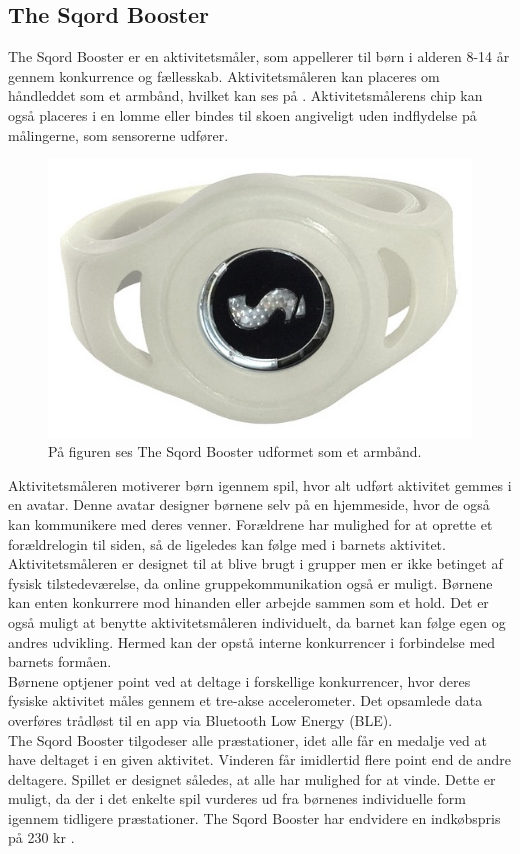 \subsection{The Sqord Booster}
The Sqord Booster er en aktivitetsmåler, som appellerer til børn i alderen 8-14 år gennem konkurrence og fællesskab. Aktivitetsmåleren kan placeres om håndleddet som et armbånd, hvilket kan ses på . Aktivitetsmålerens chip kan også placeres i en lomme eller bindes til skoen angiveligt uden indflydelse på målingerne, som sensorerne udfører. 
\begin{figure}[H]
	\centering
	\includegraphics[scale=0.21]{figures/aProblemanalyse/sqord.JPG}
	\caption{På figuren ses The Sqord Booster udformet som et armbånd. \citep{Sqord2016}}
	\label{fig:sqord}
\end{figure}\vspace{-.25cm}
Aktivitetsmåleren motiverer børn igennem spil, hvor alt udført aktivitet gemmes i en avatar. Denne avatar designer børnene selv på en hjemmeside, hvor de også kan kommunikere med deres venner. Forældrene har mulighed for at oprette et forældrelogin til siden, så de ligeledes kan følge med i barnets aktivitet. Aktivitetsmåleren er designet til at blive brugt i grupper men er ikke betinget af fysisk tilstedeværelse, da online gruppekommunikation også er muligt. Børnene kan enten konkurrere mod hinanden eller arbejde sammen som et hold. Det er også muligt at benytte aktivitetsmåleren individuelt, da barnet kan følge egen og andres udvikling. Hermed kan der opstå interne konkurrencer i forbindelse med barnets formåen. \citep{Sqord_family2015,Sqord_group2015} \\
Børnene optjener point ved at deltage i forskellige konkurrencer, hvor deres fysiske aktivitet måles gennem et tre-akse accelerometer. Det opsamlede data overføres trådløst til en app via Bluetooth Low Energy (BLE). \citep{Sqord_family2015} \\
The Sqord Booster tilgodeser alle præstationer, idet alle får en medalje ved at have deltaget i en given aktivitet. Vinderen får imidlertid flere point end de andre deltagere. Spillet er designet således, at alle har mulighed for at vinde. Dette er muligt, da der i det enkelte spil vurderes ud fra børnenes individuelle form igennem tidligere præstationer. \citep{Sqord_family2015} \newline
The Sqord Booster har endvidere en indkøbspris på 230 kr \citep{Sqord_family2015}. 

